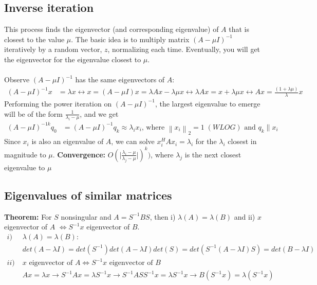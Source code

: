 \documentclass{article}
\newcommand{\norm}[2]{\left\lVert#1\right\rVert_#2}
\newcommand{\abs}[1]{\lvert#1\rvert}
\begin{document}
\subsection{Inverse iteration}
This process finds the eigenvector (and corresponding eigenvalue) of $A$ that is closest to the value $\mu$. The basic idea is to multiply matrix $(A - \mu I)^{-1}$ iteratively by a random vector, $z$, normalizing each time. Eventually, you will get the eigenvector for the eigenvalue closest to $\mu$. \\ \\ 
Observe $(A - \mu I)^{-1}$ has the same eigenvectors of $A$:
\begin{align*}
    (A - \mu I)^{-1}x &= \lambda x \longleftrightarrow x = (A - \mu I)x = \lambda Ax - \lambda \mu x \longleftrightarrow \lambda Ax = x + \lambda \mu x \longleftrightarrow Ax = \frac{(1 + \lambda \mu)}{\lambda}x
\end{align*}
Performing the power iteration on $(A - \mu I)^{-1}$, the largest eigenvalue to emerge will be of the form $\frac{1}{\lambda_i - \mu}$, and we get
\begin{align*}
    (A - \mu I)^{-1k}q_0 &= (A - \mu I)^{-1}q_{k} \approx \lambda_i x_i \textrm{, where } \norm{x_i}{2} = 1 \; (WLOG) \textrm{ and } q_k \parallel x_i
\end{align*}
Since $x_i$ is also an eigenvalue of $A$, we can solve $x_i^HAx_i = \lambda_i$ for the $\lambda_i$ closest in magnitude to $\mu$. \textbf{Convergence: } $O(\abs{\frac{\lambda_i - \mu}{\lambda_j - \mu}})^k)$, where $\lambda_j$ is the next closest eigenvalue to $\mu$

\subsection{Eigenvalues of similar matrices}
\textbf{Theorem:} For $S$ nonsingular and $A = S^{-1}BS$, then i) $\lambda(A) = \lambda(B)$ and ii) $x$ eigenvector of $A$ $\Leftrightarrow S^{-1}x$ eigenvector of $B$.
\begin{align*}
    i) \; &\lambda(A) = \lambda(B):\\
    &det(A - \lambda I) = det(S^{-1})det(A - \lambda I)det(S) = det(S^{-1}(A - \lambda I)S) = det(B - \lambda I)\\
    ii) \;& \textrm{$x$ eigenvector of $A \Leftrightarrow S^{-1}x$ eigenvector of $B$}\\
    &Ax = \lambda x \rightarrow S^{-1}Ax = \lambda S^{-1}x \rightarrow S^{-1}ASS^{-1}x = \lambda S^{-1}x \rightarrow B(S^{-1}x) = \lambda (S^{-1}x)
\end{align*}
\end{document}
